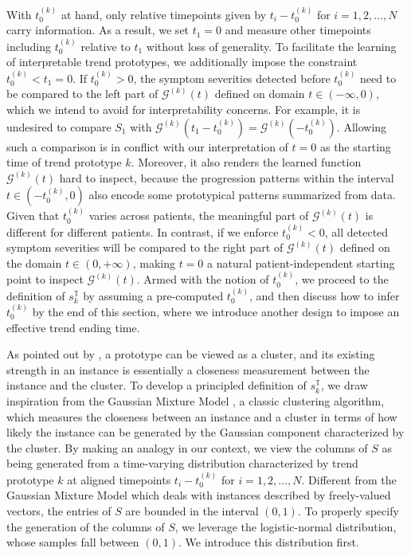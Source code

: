 \documentclass[mnsc]{informs3b} %
\begin{document}
With $t_0^{(k)}$ at hand, only relative timepoints given by $t_i-t_0^{(k)}$ for $i=1,2,\dots,N$ carry information. As a result, we set $t_1=0$ and measure other timepoints including $t_0^{(k)}$ relative to $t_1$ without loss of generality.
To facilitate the learning of interpretable trend prototypes, we additionally impose the constraint $t_0^{(k)} < t_1=0$. If $t_0^{(k)} > 0$, the symptom severities detected before $t_0^{(k)}$ need to be compared to the left part of $\mathcal{G}^{(k)}(t)$ defined on domain $t \in (-\infty, 0)$, which we intend to avoid for interpretability concerns. 
For example, it is undesired to compare $S_1$ with $\mathcal{G}^{(k)}(t_1-t_0^{(k)})=\mathcal{G}^{(k)}(-t_0^{(k)})$.
Allowing such a comparison is in conflict with our interpretation of $t=0$ as the starting time of trend prototype $k$. Moreover, it also renders the learned function $\mathcal{G}^{(k)}(t)$ hard to inspect, because the progression patterns within the interval $t\in(-t_0^{(k)}, 0)$ also encode some prototypical patterns summarized from data. Given that $t_0^{(k)}$ varies across patients, the meaningful part of $\mathcal{G}^{(k)}(t)$ is different for different patients. 
In contrast, if we enforce $t_0^{(k)}<0$, all detected symptom severities will be compared to the right part of $\mathcal{G}^{(k)}(t)$ defined on the domain $t \in (0, +\infty)$, making $t=0$ a natural patient-independent starting point to inspect $\mathcal{G}^{(k)}(t)$.
Armed with the notion of $t_0^{(k)}$, we proceed to the definition of $s_k^{\mathbb{T}}$ by assuming a pre-computed $t_0^{(k)}$, and then discuss how to infer $t_0^{(k)}$ by the end of this section, where we introduce another design to impose an effective trend ending time. 

As pointed out by \cite{chen_this_2019}, a prototype can be viewed as a cluster, and its existing strength in an instance is essentially a closeness measurement between the instance and the cluster. 
To develop a principled definition of $s_k^{\mathbb{T}}$, we draw inspiration from the Gaussian Mixture Model \citep{murphy_probabilistic_2022}, a classic clustering algorithm, which measures the closeness between an instance and a cluster in terms of how likely the instance can be generated by the Gaussian component characterized by the cluster. By making an analogy in our context, we view the columns of $S$ as being generated from a time-varying distribution characterized by trend prototype $k$ at aligned timepoints $t_i-t_0^{(k)}$ for $i=1,2,\dots,N$. Different from the Gaussian Mixture Model which deals with instances described by freely-valued vectors, the entries of $S$ are bounded in the interval $(0,1)$. To properly specify the generation of the columns of $S$, we leverage the logistic-normal distribution, whose samples fall between $(0,1)$. We introduce this distribution first.
\end{document}
